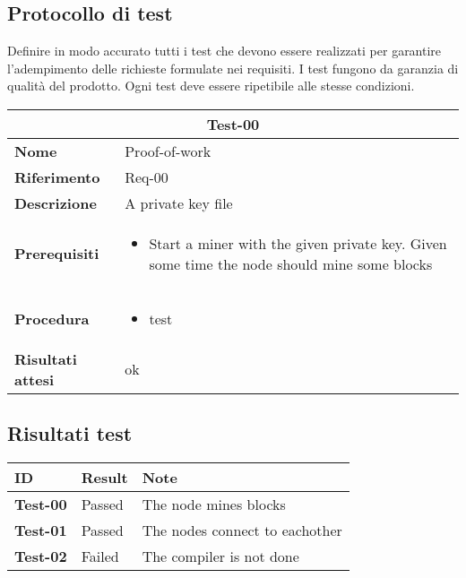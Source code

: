 \documentclass[../main.tex]{subfiles}
\begin{document}
\newcommand{\requirement}[7]{
    \bgroup{}
    \def\arraystretch{1.25}
    \begin{center}
        \begin{tabular}{ |l|p{9cm}| }
            \hline
            \multicolumn{2}{|c|}{\textbf{Test-#1}} \\
            \hline
            \textbf{Nome} & #2 \\
            \hline
            \textbf{Riferimento} & #3 \\
            \hline
            \textbf{Descrizione} & #4 \\
            \hline
            \textbf{Prerequisiti} &
            \begin{itemize}
                #5
            \end{itemize} \\
            \hline
            \textbf{Procedura} &
            \begin{itemize}
                #6
            \end{itemize} \\
            \hline
            \textbf{Risultati attesi} & #7 \\
            \hline
        \end{tabular}
    \end{center}
    \egroup{}
}
\subsection{Protocollo di test}

Definire in modo accurato tutti i test che devono essere realizzati per
garantire l’adempimento delle richieste formulate nei requisiti. I test
fungono da garanzia di qualità del prodotto. Ogni test deve essere
ripetibile alle stesse condizioni.


\requirement{00}
    {Proof-of-work}
    {Req-00}
    {A private key file}
    {\item Start a miner with the given private key. Given some time the node should mine some blocks}
    {\item test}
    {ok}

\subsection{Risultati test}

\bgroup{}
\def\arraystretch{1.25}
\begin{center}
    \begin{tabular}{ |l|l|l| }
        \hline
        \textbf{ID} & Result & Note \\
        \hline
        \textbf{Test-00} & \color{darckgreen} Passed & The node mines blocks \\
        \hline
        \textbf{Test-01} & \color{darckgreen} Passed & The nodes connect to eachother \\
        \hline
        \textbf{Test-02} & \color{red} Failed & The compiler is not done \\
        \hline
    \end{tabular}
\end{center}
\egroup{}
\end{document}
